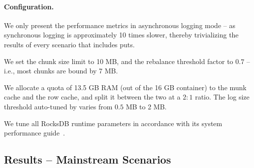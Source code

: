 \paragraph{Configuration.} 
We only present the performance metrics in asynchronous logging mode -- as synchronous logging 
is approximately 10 times slower, thereby trivializing the results of every scenario that includes puts. 

We set the \sys\/ chunk size limit to 10 MB, and the rebalance threshold factor to $0.7$ -- i.e., 
most chunks are bound by 7 MB. 

We allocate a quota of 13.5 GB RAM (out of the 16 GB container) to the munk cache and the row cache, 
and split it between the two at a $2:1$ ratio. The log size threshold auto-tuned by \sys\/ varies from    
$0.5$ MB to 2 MB. 

We tune all RocksDB runtime parameters in accordance with its system performance guide~\cite{RocksDBPerf}.   

\subsection{Results -- Mainstream Scenarios}

